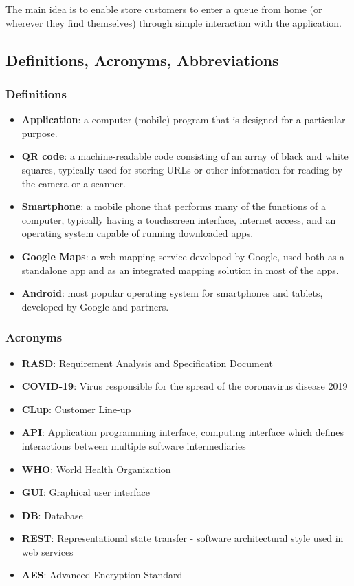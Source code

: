 The main idea is to enable store customers to enter a queue from home (or wherever they find themselves) through simple interaction with the application. 

\newpage

\subsection{Definitions, Acronyms, Abbreviations}
\subsubsection{Definitions}
\begin{itemize} 
	\item \textbf{Application}: a computer (mobile) program that is designed for a particular purpose. 
	\item \textbf{QR code}: a machine-readable code consisting of an array of black and white squares, typically used for storing URLs or other information for reading by the camera or a scanner. 
	\item \textbf{Smartphone}: a mobile phone that performs many of the functions of a computer, typically having a touchscreen interface, internet access, and an operating system capable of running downloaded apps. 
	\item \textbf{Google Maps}: a web mapping service developed by Google, used both as a standalone app and as an integrated mapping solution in most of the apps.
	\item \textbf{Android}: most popular operating system for smartphones and tablets, developed by Google and partners.
\end{itemize}
\subsubsection{Acronyms}
\begin{itemize}
	\item \textbf{RASD}: Requirement Analysis and Specification Document
	\item \textbf{COVID-19}: Virus responsible for the spread of the coronavirus disease 2019
	\item \textbf{CLup}: Customer Line-up
	\item \textbf{API}: Application programming interface, computing interface which defines interactions between multiple software intermediaries 
	\item \textbf{WHO}: World Health Organization
	\item \textbf{GUI}: Graphical user interface
	\item \textbf{DB}: Database
	\item \textbf{REST}: Representational state transfer - software architectural style used in web services
	\item \textbf{AES}: Advanced Encryption Standard
\end{itemize}
